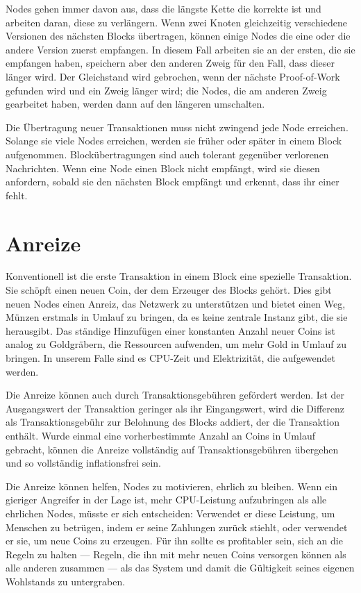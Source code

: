 \documentclass[9pt]{article}
\begin{document}
	Nodes gehen immer davon aus, dass die längste Kette die korrekte ist und arbeiten daran, diese zu verlängern. Wenn zwei Knoten gleichzeitig verschiedene Versionen des nächsten Blocks übertragen, können einige Nodes die eine oder die andere Version zuerst empfangen. In diesem Fall arbeiten sie an der ersten, die sie empfangen haben, speichern aber den anderen Zweig für den Fall, dass dieser länger wird. Der Gleichstand wird gebrochen, wenn der nächste Proof-of-Work gefunden wird und ein Zweig länger wird; die Nodes, die am anderen Zweig gearbeitet haben, werden dann auf den längeren umschalten.

	\newpage
	
	Die Übertragung neuer Transaktionen muss nicht zwingend jede Node erreichen. Solange sie viele Nodes erreichen, werden sie früher oder später in einem Block aufgenommen. Blockübertragungen sind auch tolerant gegenüber verlorenen Nachrichten. Wenn eine Node einen Block nicht empfängt, wird sie diesen anfordern, sobald sie den nächsten Block empfängt und erkennt, dass ihr einer fehlt.
		
	\section{Anreize}
	
	Konventionell ist die erste Transaktion in einem Block eine spezielle Transaktion. Sie schöpft einen neuen Coin, der dem Erzeuger des Blocks gehört. Dies gibt neuen Nodes einen Anreiz, das Netzwerk zu unterstützen und bietet einen Weg, Münzen erstmals in Umlauf zu bringen, da es keine zentrale Instanz gibt, die sie herausgibt. Das ständige Hinzufügen einer konstanten Anzahl neuer Coins ist analog zu Goldgräbern, die Ressourcen aufwenden, um mehr Gold in Umlauf zu bringen. In unserem Falle sind es CPU-Zeit und Elektrizität, die aufgewendet werden.

    Die Anreize können auch durch Transaktionsgebühren gefördert werden. Ist der Ausgangswert der Transaktion geringer als ihr Eingangswert, wird die Differenz als Transaktionsgebühr zur Belohnung des Blocks addiert, der die Transaktion enthält. Wurde einmal eine vorherbestimmte Anzahl an Coins in Umlauf gebracht, können die Anreize vollständig auf Transaktionsgebühren übergehen und so vollständig inflationsfrei sein.

    Die Anreize können helfen, Nodes zu motivieren, ehrlich zu bleiben. Wenn ein gieriger Angreifer in der Lage ist, mehr CPU-Leistung aufzubringen als alle ehrlichen Nodes, müsste er sich entscheiden: Verwendet er diese Leistung, um Menschen zu betrügen, indem er seine Zahlungen zurück stiehlt, oder verwendet er sie, um neue Coins zu erzeugen. Für ihn sollte es profitabler sein, sich an die Regeln zu halten — Regeln, die ihn mit mehr neuen Coins versorgen können als alle anderen zusammen — als das System und damit die Gültigkeit seines eigenen Wohlstands zu untergraben.
\end{document}
